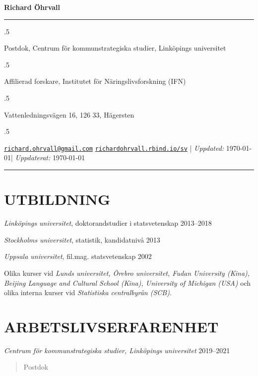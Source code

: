 \documentclass[11pt,]{article}
\begin{document}
\centerline{\huge \bf Richard Öhrvall}

\vspace{2 mm}

\hrule

\vspace{2 mm}

\moveleft.5\hoffset\centerline{Postdok, Centrum för kommunstrategiska studier, Linköpings universitet}
\moveleft.5\hoffset\centerline{Affilierad forskare, Institutet för Näringslivsforskning (IFN)}
\moveleft.5\hoffset\centerline{Vattenledningsvägen 16, 126 33, Hägersten}
\moveleft.5\hoffset\centerline{ \faEnvelopeO \hspace{1 mm} \href{mailto:}{\tt \href{mailto:richard.ohrvall@gmail.com}{\nolinkurl{richard.ohrvall@gmail.com}}} \hspace{1 mm}     \faGlobe \hspace{1 mm} \href{https://richardohrvall.rbind.io/sv}{\tt richardohrvall.rbind.io/sv}    | \emph{Uppdated:} \today   | \emph{Uppdaterat:} \today}

\vspace{2 mm}

\hrule


\hypertarget{utbildning}{%
\section{UTBILDNING}\label{utbildning}}

\emph{Linköpings universitet}, doktorandstudier i statsvetenskap
\hfill 2013--2018

\emph{Stockholms universitet}, statistik, kandidatnivå \hfill 2013

\emph{Uppsala universitet}, fil.mag. statsvetenskap \hfill 2002

Olika kurser vid \emph{Lunds universitet, Örebro universitet, Fudan
University (Kina), Beijing Language and Cultural School (Kina),
University of Michigan (USA)} och olika interna kurser vid
\emph{Statistiska centralbyrån (SCB)}.

\hypertarget{arbetslivserfarenhet}{%
\section{ARBETSLIVSERFARENHET}\label{arbetslivserfarenhet}}

\emph{Centrum för kommunstrategiska studier, Linköpings universitet}
\hfill 2019--2021

\begin{quote}
Postdok
\end{quote}
\end{document}
